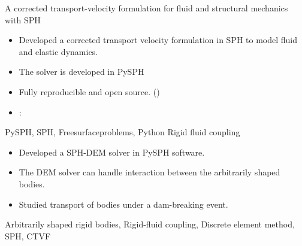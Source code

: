 \begin{experiences}
  \emptySeparator
  \experience
    {}   {A corrected transport-velocity formulation for fluid and structural mechanics with SPH}{}{}
    {} {
                      \begin{itemize}
                      \item Developed a corrected transport velocity formulation in SPH to model
                        fluid and elastic dynamics.
                      \item The solver is developed in PySPH %
                      \item Fully reproducible and open source. ()
                      \item \faGithub: 
                      \end{itemize}
                    }
                    {PySPH, SPH, Freesurfaceproblems, Python}
  \emptySeparator
  \experience
  {} {Rigid fluid coupling}{}{}
  {}    {
                    \begin{itemize}
                    \item Developed a SPH-DEM solver in PySPH software.
                    \item The DEM solver can handle interaction between the arbitrarily shaped bodies.
                    \item Studied transport of bodies under a dam-breaking event.
                    \end{itemize}
                  }
                  {Arbitrarily shaped rigid bodies, Rigid-fluid coupling, Discrete element method, SPH, CTVF}


\end{experiences}
